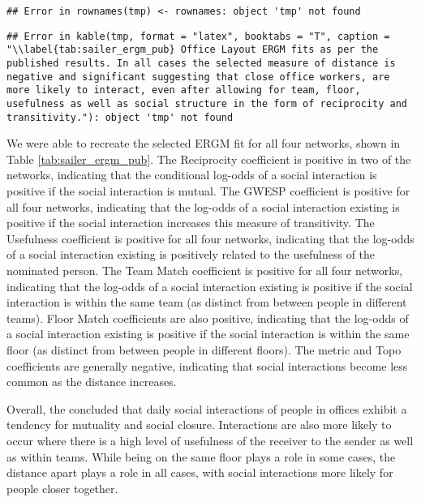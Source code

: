 \documentclass[
]{statsoc}
\begin{document}
\begin{verbatim}
## Error in rownames(tmp) <- rownames: object 'tmp' not found
\end{verbatim}

\begin{verbatim}
## Error in kable(tmp, format = "latex", booktabs = "T", caption = "\\label{tab:sailer_ergm_pub} Office Layout ERGM fits as per the published results. In all cases the selected measure of distance is negative and significant suggesting that close office workers, are more likely to interact, even after allowing for team, floor, usefulness as well as social structure in the form of reciprocity and transitivity."): object 'tmp' not found
\end{verbatim}

We were able to recreate the selected ERGM fit for all four networks,
shown in Table \ref{tab:sailer_ergm_pub}. The Reciprocity coefficient is
positive in two of the networks, indicating that the conditional
log-odds of a social interaction is positive if the social interaction
is mutual. The GWESP coefficient is positive for all four networks,
indicating that the log-odds of a social interaction existing is
positive if the social interaction increases this measure of
transitivity. The Usefulness coefficient is positive for all four
networks, indicating that the log-odds of a social interaction existing
is positively related to the usefulness of the nominated person. The
Team Match coefficient is positive for all four networks, indicating
that the log-odds of a social interaction existing is positive if the
social interaction is within the same team (as distinct from between
people in different teams). Floor Match coefficients are also positive,
indicating that the log-odds of a social interaction existing is
positive if the social interaction is within the same floor (as distinct
from between people in different floors). The metric and Topo
coefficients are generally negative, indicating that social interactions
become less common as the distance increases.

Overall, the \cite{Sailer2012} concluded that daily social interactions
of people in offices exhibit a tendency for mutuality and social
closure. Interactions are also more likely to occur where there is a
high level of usefulness of the receiver to the sender as well as within
teams. While being on the same floor plays a role in some cases, the
distance apart plays a role in all cases, with social interactions more
likely for people closer together.
\end{document}

